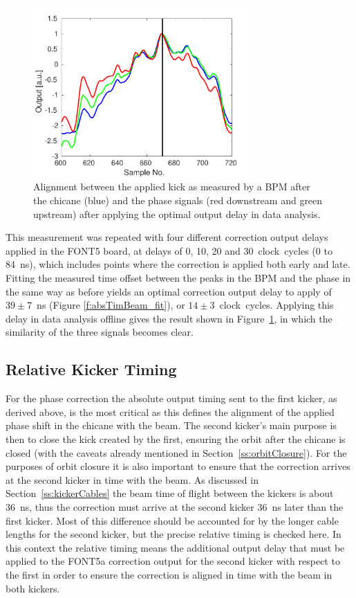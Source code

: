 \begin{figure}
  \centering
  \includegraphics[width=0.75\textwidth]{Figures/commissioning/absTimBeam_opt}
  \caption{Alignment between the applied kick as measured by a BPM after the chicane (blue) and the phase signals (red downstream and green upstream) after applying the optimal output delay in data analysis.}
  \label{f:absTimBeam_opt}
\end{figure}

This measurement was repeated with four different correction output delays applied in the FONT5 board, at delays of 0, 10, 20 and 30~clock~cycles (0 to 84~ns), which includes points where the correction is applied both early and late. Fitting the measured time offset between the peaks in the BPM and the phase in the same way as before yields an optimal correction output delay to apply of \(39\pm7\)~ns (Figure \ref{f:absTimBeam_fit}), or \(14\pm3\)~clock~cycles. Applying this delay in data analysis offline gives the result shown in Figure~\ref{f:absTimBeam_opt}, in which the similarity of the three signals becomes clear.

\subsection{Relative Kicker Timing}
\label{ss:relativeTiming}

For the phase correction the absolute output timing sent to the first kicker, as derived above, is the most critical as this defines the alignment of the applied phase shift in the chicane with the beam. The second kicker's main purpose is then to close the kick created by the first, ensuring the orbit after the chicane is closed (with the caveats already mentioned in Section~\ref{ss:orbitClosure}). For the purposes of orbit closure it is also important to ensure that the correction arrives at the second kicker in time with the beam. As discussed in Section~\ref{ss:kickerCables} the beam time of flight between the kickers is about 36~ns, thus the correction must arrive at the second kicker 36~ns later than the first kicker. Most of this difference should be accounted for by the longer cable lengths for the second kicker, but the precise relative timing is checked here. In this context the relative timing means the additional output delay that must be applied to the FONT5a correction output for the second kicker with respect to the first in order to ensure the correction is aligned in time with the beam in both kickers.

